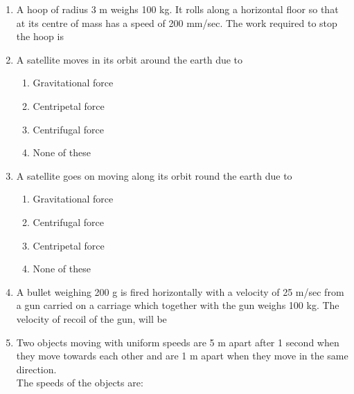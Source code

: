 \documentclass[11pt,a4paper]{article}
\begin{document}
\begin{enumerate}
\begin{enumerate}[label=\Alph*.]
\end{enumerate}
\item{A hoop of radius 3 m weighs 100 kg. It rolls along a horizontal floor so that at its centre of mass has a speed of 200 mm/sec. The work required to stop the hoop is}
\\
\item{A satellite moves in its orbit around the earth due to}
\begin{enumerate}[label=\Alph*.]
\item{Gravitational force}
\item{Centripetal force}
\item{Centrifugal force}
\item{None of these}
\end{enumerate}
\item{A satellite goes on moving along its orbit round the earth due to}
\begin{enumerate}[label=\Alph*.]
\item{Gravitational force}
\item{Centrifugal force}
\item{Centripetal force}
\item{None of these}
\end{enumerate}
\item{A bullet weighing 200 g is fired horizontally with a velocity of 25 m/sec from a gun carried on a carriage which together with the gun weighs 100 kg. The velocity of recoil of the gun, will be}
\\
\item{Two objects moving with uniform speeds are 5 m apart after 1 second when they move towards each other and are 1 m apart when they move in the same direction. \\
The speeds of the objects are:}
\begin{enumerate}[label=\Alph*.]

\end{enumerate}
\end{enumerate}
\end{document}
